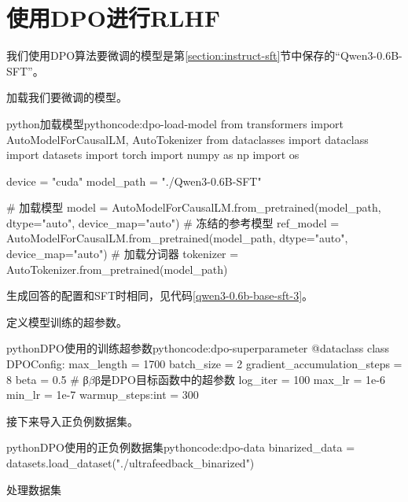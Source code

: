 \documentclass[lang=cn,newtx,10pt,scheme=chinese]{elegantbook}
\begin{document}
\chapter{使用DPO进行RLHF}

\begin{marker}
我们使用DPO算法要微调的模型是第\ref{section:instruct-sft}节中保存的``Qwen3-0.6B-SFT''。
\end{marker}

加载我们要微调的模型。

\begin{codebox}{python}{加载模型}{pythoncode:dpo-load-model}
from transformers import AutoModelForCausalLM, AutoTokenizer
from dataclasses import dataclass
import datasets
import torch
import numpy as np
import os

device = "cuda"
model_path = "./Qwen3-0.6B-SFT"

# 加载模型
model = AutoModelForCausalLM.from_pretrained(model_path, dtype="auto", device_map="auto")
# 冻结的参考模型
ref_model = AutoModelForCausalLM.from_pretrained(model_path, dtype="auto", device_map="auto")
# 加载分词器
tokenizer = AutoTokenizer.from_pretrained(model_path)
\end{codebox}

生成回答的配置和SFT时相同，见代码\ref{qwen3-0.6b-base-sft-3}。

定义模型训练的超参数。

\begin{codebox}{python}{DPO使用的训练超参数}{pythoncode:dpo-superparameter}
@dataclass
class DPOConfig:
    max_length = 1700
    batch_size = 2
    gradient_accumulation_steps = 8
    beta = 0.5 # β$\beta$β是DPO目标函数中的超参数
    log_iter = 100
    max_lr = 1e-6
    min_lr = 1e-7
    warmup_steps:int = 300
\end{codebox}

接下来导入正负例数据集。

\begin{codebox}{python}{DPO使用的正负例数据集}{pythoncode:dpo-data}
binarized_data = datasets.load_dataset("./ultrafeedback_binarized")
\end{codebox}

处理数据集
\end{document}
